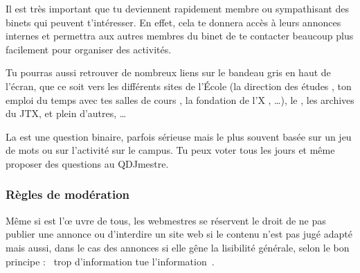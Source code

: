 Il est très important que tu deviennent rapidement membre ou sympathisant des binets qui peuvent t'intéresser.
En effet, cela te donnera accès à leurs annonces internes et permettra aux autres membres du binet de te 
contacter beaucoup plus facilement pour organiser des activités.


Tu pourras aussi retrouver de nombreux liens sur le bandeau gris en haut de l'écran, que ce soit vers les différents sites de l'École (la direction des études , ton emploi du temps avec tes salles de cours , la fondation de l'X , \dots), le , les archives du JTX, et plein d'autres, \dots


La  est une question binaire, parfois sérieuse mais le
plus souvent basée sur un jeu de mots ou sur l'activité sur le
campus. Tu peux voter tous les jours et même proposer des questions
au QDJmestre.

\subsubsection{Règles de modération}

Même si \fkz est l'œ uvre de tous, les webmestres se réservent le droit de ne pas publier une annonce ou d'interdire un site web si le contenu
n'est pas jugé adapté mais aussi, dans le cas des annonces si elle gêne la lisibilité générale, selon le bon principe : \guillemotleft~trop
d'information tue l'information~\guillemotright .

